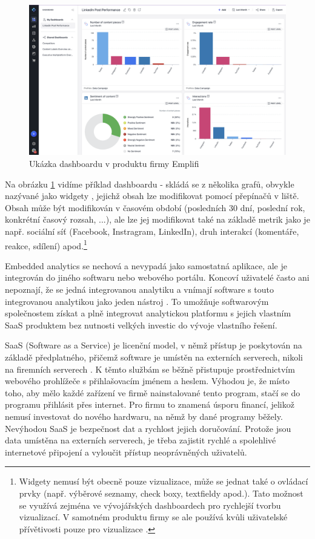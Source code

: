 \documentclass[czech, bc, kiv, he, iso690numb]{fasthesis}
\begin{document}
\begin{figure}
	\centering
	\includegraphics[width=1\textwidth]{pictures/emplifi-dashboard-example.png}
	\caption{Ukázka dashboardu v produktu firmy Emplifi \cite{emplifidashboardIMAGE}}
	\label{fig:emplifiDashUkazka}
\end{figure}

Na obrázku \ref{fig:emplifiDashUkazka} vidíme příklad dashboardu - skládá se z několika grafů, obvykle nazývané jako widgety \cite{emplifiDashboard}, jejichž obsah lze modifikovat pomocí přepínačů v liště. Obsah může být modifikován v časovém období (posledních 30 dní, poslední rok, konkrétní časový rozsah, ...), ale lze jej modifikovat také na základě metrik jako je např. sociální síť (Facebook, Instragram, LinkedIn), druh interakcí (komentáře, reakce, sdílení) apod.\footnote{Widgety nemusí být obecně pouze vizualizace, může se jednat také o ovládací prvky (např. výběrové seznamy, check boxy, textfieldy apod.). Tato možnost se využívá zejména ve vývojářských dashboardech pro rychlejší tvorbu vizualizací. V samotném produktu firmy se ale používá kvůli uživatelské přívětivosti pouze pro vizualizace \cite{emplifiDashboard}. 
}

Embedded analytics se nechová a nevypadá jako samostatná aplikace, ale je integrován do jiného softwaru nebo webového portálu. Koncoví uživatelé často ani nepoznají, že se jedná
integrovanou analytiku a vnímají software s touto integrovanou analytikou jako jeden nástroj \cite{goodDataEmbedded}. To umožňuje softwarovým společnostem získat a plně
integrovat analytickou platformu s jejich vlastním SaaS produktem bez nutnosti velkých investic do vývoje vlastního řešení. 

SaaS (Software as a Service) je licenční model, v němž přístup je poskytován na základě předplatného, přičemž software je umístěn na externích serverech, nikoli na firemních serverech \cite{saasDefinition}.
K těmto službám se běžně přistupuje prostřednictvím webového prohlížeče s přihlašovacím jménem a heslem. Výhodou je, že místo toho, aby mělo každé zařízení ve firmě nainstalované
tento program, stačí se do programu přihlásit přes internet. Pro firmu to znamená úsporu financí, jelikož nemusí investovat do nového hardwaru, na němž by dané programy běžely. 
Nevýhodou SaaS je bezpečnost dat a rychlost jejich doručování. Protože jsou data umístěna na externích serverech, je třeba zajistit rychlé a spolehlivé internetové připojení a vyloučit
přístup neoprávněných uživatelů.
\end{document}
